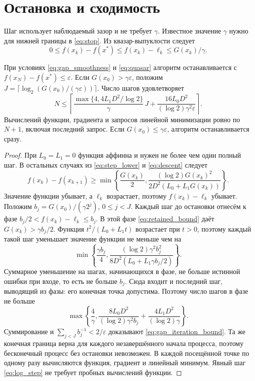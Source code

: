 \section{Остановка и сходимость}
\label{sec:rates}
Шаг использует наблюдаемый зазор и не требует $\gamma$.
Известное значение $\gamma$ нужно для нижней границы в
\eqref{eq:stop}. Из квазар-выпуклости следует
\begin{equation}\label{eq:retained_bound}
 0\le f(x_k)-f(x^*)\le f(x_k)-\ell_k\le G(x_k)/\gamma.
\end{equation}

\begin{theorem}
\label{thm:gap_stopping}
При условиях \eqref{eq:gap_smoothness} и \eqref{eq:quasar}
алгоритм останавливается с $f(x_N)-f(x^*)\le\varepsilon$.
Если $G(x_0)>\gamma\varepsilon$, положим
$J=\lceil\log_2(G(x_0)/(\gamma\varepsilon))\rceil$.
Число шагов удовлетворяет
\begin{equation}\label{eq:gap_iteration_bound}
 N\le\left\lceil
 \frac{\max\{4,4L_1D^2/\log 2\}}{\gamma}\,J
 +\frac{16L_0D^2}{(\log 2)\gamma^2\varepsilon}
 \right\rceil.
\end{equation}
Вычислений функции, градиента и запросов линейной минимизации
ровно по $N+1$, включая последний запрос.
Если $G(x_0)\le\gamma\varepsilon$, алгоритм останавливается сразу.
\end{theorem}
\begin{proof}
При $L_0=L_1=0$ функция аффинна и нужен не более чем один полный шаг.
В остальных случаях из \eqref{eq:step_lower} и \eqref{eq:descent} следует
\begin{equation}\label{eq:gap_progress}
 f(x_k)-f(x_{k+1})\ge
 \min\left\{\frac{G(x_k)}2,
 \frac{(\log 2)G(x_k)^2}{2D^2(L_0+L_1G(x_k))}\right\}.
\end{equation}
Значение функции убывает, а $\ell_k$ возрастает, поэтому
$f(x_k)-\ell_k$ убывает. Положим $b_j=G(x_0)/(\gamma2^j)$,
$0\le j<J$. Каждый шаг до остановки отнесём к фазе
$b_j/2<f(x_k)-\ell_k\le b_j$.
В этой фазе \eqref{eq:retained_bound} даёт $G(x_k)>\gamma b_j/2$.
Функция $t^2/(L_0+L_1t)$ возрастает при $t>0$, поэтому каждый
такой шаг уменьшает значение функции не меньше чем на
\[
 \min\left\{\frac{\gamma b_j}{4},
 \frac{(\log 2)\gamma^2b_j^2}{8D^2(L_0+L_1\gamma b_j/2)}\right\}.
\]
Суммарное уменьшение на шагах, начинающихся в фазе, не больше
истинной ошибки при входе, то есть не больше $b_j$.
Сюда входит и последний шаг, выводящий из фазы: его конечная
точка допустима. Поэтому число шагов в фазе не больше
\[
 \max\left\{\frac4\gamma,
 \frac{8L_0D^2}{(\log 2)\gamma^2b_j}
 +\frac{4L_1D^2}{(\log 2)\gamma}\right\}.
\]
Суммирование и $\sum_{j<J}b_j^{-1}<2/\varepsilon$ доказывают
\eqref{eq:gap_iteration_bound}. Та же конечная граница верна для
каждого незавершённого начала процесса, поэтому бесконечный процесс
без остановки невозможен. В каждой посещённой точке по одному разу
вычисляются функция, градиент и линейный минимум.
Явный шаг \eqref{eq:log_step} не требует пробных вычислений функции.
\end{proof}

